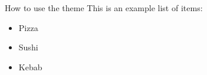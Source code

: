 \begin{frame}{How to use the theme}
  This is an example list of items:
  \begin{itemize}
    \item Pizza
    \item Sushi
    \item Kebab
  \end{itemize}
\end{frame}
